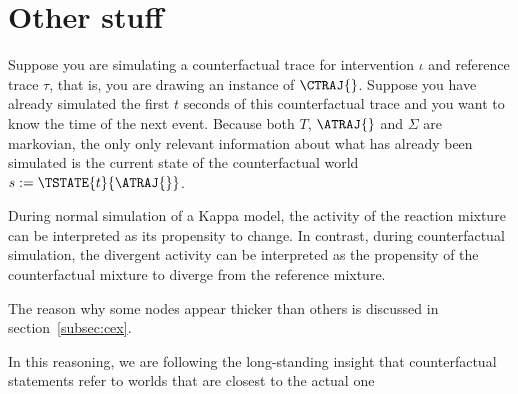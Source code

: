 \section*{Other stuff}

Suppose you are simulating a counterfactual trace for intervention
$\iota$ and reference trace $\tau$, that is, you are drawing an
instance of $\CTRAJ{}$. Suppose you have already simulated the first
$t$ seconds of this counterfactual trace and you want to know the time
of the next event. Because both $T$, $\ATRAJ{}$ and $\Sigma$ are
markovian, the only only relevant information about what has already
been simulated is the current state of the counterfactual world
$s := \TSTATE{t}{\ATRAJ{}}$.

During normal simulation of a Kappa model, the activity of the
reaction mixture can be interpreted as its propensity to change. In
contrast, during counterfactual simulation, the divergent activity can
be interpreted as the propensity of the counterfactual mixture to
diverge from the reference mixture.

The reason why some nodes appear thicker than others is discussed in
section~\ref{subsec:cex}.


In this reasoning, we are following the
long-standing insight \cite{Lewis1973,pearl2009causality} that
counterfactual statements refer to worlds that are closest to
the actual one
